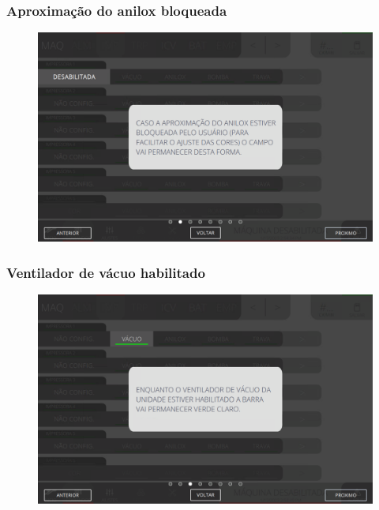 \subsubsection{\small{Aproximação do anilox bloqueada}} \label{sec:telaComandoImpressorasAproximacaoAniloxBloqueada}
\vspace*{\fill}
\begin{figure}[h]
    \centering
    \includegraphics[width=576 px,height=360 px]{src/imagesICV/04-printters/01-printters/commands/2.png}
\end{figure}
\vspace*{\fill}

\newpage
\thispagestyle{fancy}
\vspace*{40 pt}
\subsubsection{\small{Ventilador de vácuo habilitado}} \label{sec:telaComandoImpressorasVentiladorDeVacioHabilitado}
\vspace*{\fill}
\begin{figure}[h]
    \centering
    \includegraphics[width=576 px,height=360 px]{src/imagesICV/04-printters/01-printters/commands/3.png}
\end{figure}
\vspace*{\fill}

